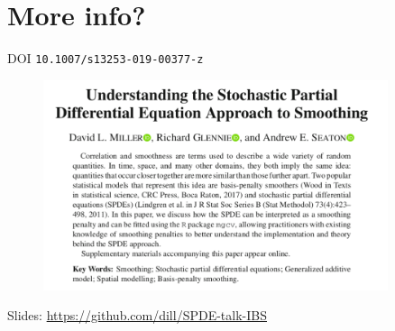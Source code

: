 \documentclass{beamer}
\begin{document}
\section{More info?}

\begin{frame}{DOI \texttt{10.1007/s13253-019-00377-z}}
  \begin{figure}[htbp]
    \begin{center}
      \includegraphics[width=0.9\textwidth]{figures/paper.png}
    \end{center}
  \end{figure}
  \begin{center}
  Slides: \url{https://github.com/dill/SPDE-talk-IBS}
  \end{center}
  
\end{frame}

%
\end{document}
